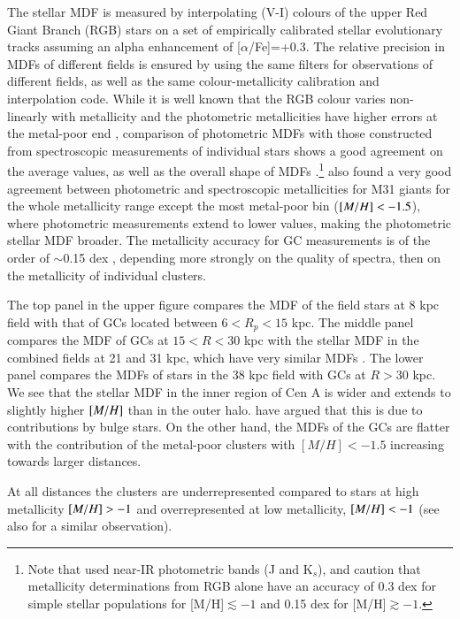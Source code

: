 \documentclass{aa}
\begin{document}
The stellar MDF is measured by interpolating (V-I) colours of the upper Red Giant Branch (RGB) stars on a set of 
empirically calibrated stellar evolutionary tracks \citep{harris99} assuming an alpha enhancement
of [$\alpha$/Fe]=+0.3. The relative precision in MDFs of different fields is ensured by using the same
filters for observations of different fields, as well as the same colour-metallicity calibration
and interpolation code. While it is well known that the RGB colour varies non-linearly with metallicity 
and the photometric metallicities have higher errors at the metal-poor end \citep{saviane00,harris00}, 
comparison of photometric MDFs with those constructed from spectroscopic measurements of individual
stars shows a good agreement on the average values, as well as the overall shape
of MDFs \citep[e.g.][for a wide MDF in the Milky Way bulge]{gonzalez11}.\footnote{Note that \citet{gonzalez11} used 
near-IR photometric bands (J and K$_s$), and \citet{streich14} caution that metallicity determinations 
from RGB alone have an accuracy of 0.3 dex for simple stellar populations for [M/H]$\lesssim -1$ and 
0.15 dex for [M/H]$\gtrsim -1$.} \citet{kalirai06} also found a very good agreement between photometric and 
spectroscopic metallicities for M31 giants for  the whole metallicity range except the most metal-poor bin ($\mbox{$[M/H]$}<-1.5$), where photometric measurements extend to lower values, making the photometric stellar MDF broader. The metallicity accuracy for GC 
measurements is of the order of $\sim$0.15 dex \citep{beasley08}, depending more strongly on the quality of spectra, 
then on the metallicity of individual clusters.


The top panel in the upper figure 
compares the MDF of the field stars at 8 kpc field with that of GCs located between $6 < R_p < 15$ kpc. 
The middle panel compares the MDF of GCs at $15 <R<30$ kpc with the stellar MDF in the combined 
fields at 21 and 31 kpc, which have very similar MDFs \citep{rejkuba05}.
The lower panel compares the MDFs of stars in the 38 kpc field with GCs at $R>30$ kpc.
We see that the stellar MDF in the inner region of Cen A is wider and extends to slightly higher $\mbox{$[M/H]$}$ than 
in the outer halo. \citet{harrisharris02} have argued that this is due to contributions by bulge stars. 
On the other hand, the MDFs of the GCs are flatter with the contribution of the metal-poor clusters 
with $[M/H] < -1.5$ increasing towards larger distances.


At all distances the clusters are underrepresented compared to stars at high
metallicity $\mbox{$[M/H]$} > -1$ and overrepresented at low metallicity, $\mbox{$[M/H]$} < -1$
(see also \citet{beasley08} for a similar observation). 
\end{document}
